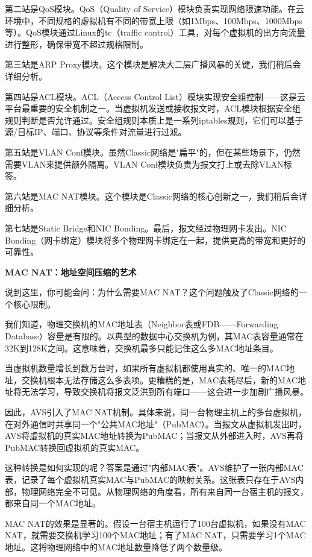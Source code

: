 第二站是QoS模块。QoS（Quality of Service）模块负责实现网络限速功能。在云环境中，不同规格的虚拟机有不同的带宽上限（如1Mbps、100Mbps、1000Mbps等）。QoS模块通过Linux的tc（traffic control）工具，对每个虚拟机的出方向流量进行整形，确保带宽不超过规格限制。

第三站是ARP Proxy模块。这个模块是解决大二层广播风暴的关键，我们稍后会详细分析。

第四站是ACL模块。ACL（Access Control List）模块实现安全组控制——这是云平台最重要的安全机制之一。当虚拟机发送或接收报文时，ACL模块根据安全组规则判断是否允许通过。安全组规则本质上是一系列iptables规则，它们可以基于源/目标IP、端口、协议等条件对流量进行过滤。

第五站是VLAN Conf模块。虽然Classic网络是"扁平"的，但在某些场景下，仍然需要VLAN来提供额外隔离。VLAN Conf模块负责为报文打上或去除VLAN标签。

第六站是MAC NAT模块。这个模块是Classic网络的核心创新之一，我们稍后会详细分析。

第七站是Static Bridge和NIC Bonding。最后，报文经过物理网卡发出。NIC Bonding（网卡绑定）模块将多个物理网卡绑定在一起，提供更高的带宽和更好的可靠性。

\textbf{MAC NAT：地址空间压缩的艺术}

说到这里，你可能会问：为什么需要MAC NAT？这个问题触及了Classic网络的一个核心限制。

我们知道，物理交换机的MAC地址表（Neighbor表或FDB——Forwarding Database）容量是有限的。以典型的数据中心交换机为例，其MAC表容量通常在32K到128K之间。这意味着，交换机最多只能记住这么多MAC地址条目。

当虚拟机数量增长到数万台时，如果所有虚拟机都使用真实的、唯一的MAC地址，交换机根本无法存储这么多表项。更糟糕的是，MAC表耗尽后，新的MAC地址将无法学习，导致交换机将报文泛洪到所有端口——这会进一步加剧广播风暴。

因此，AVS引入了MAC NAT机制。具体来说，同一台物理主机上的多台虚拟机，在对外通信时共享同一个"公共MAC地址"（PubMAC）。当报文从虚拟机发出时，AVS将虚拟机的真实MAC地址转换为PubMAC；当报文从外部进入时，AVS再将PubMAC转换回虚拟机的真实MAC。

这种转换是如何实现的呢？答案是通过"内部MAC表"。AVS维护了一张内部MAC表，记录了每个虚拟机真实MAC与PubMAC的映射关系。这张表只存在于AVS内部，物理网络完全不可见。从物理网络的角度看，所有来自同一台宿主机的报文，都来自同一个MAC地址。

MAC NAT的效果是显著的。假设一台宿主机运行了100台虚拟机，如果没有MAC NAT，就需要交换机学习100个MAC地址；有了MAC NAT，只需要学习1个MAC地址。这将物理网络中的MAC地址数量降低了两个数量级。

